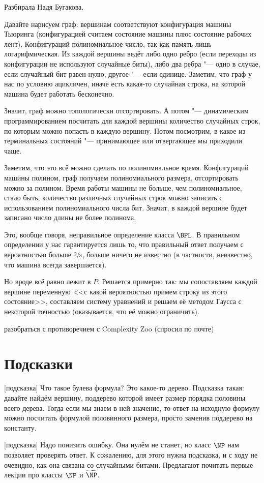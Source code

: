 	Разбирала Надя Бугакова.

	Давайте нарисуем граф: вершинам соответствуют конфигурация машины Тьюринга (конфигурацией
	считаем состояние машины плюс состояние рабочих лент).
	Конфигураций полиномиальное число, так как память лишь логарифмическая.
	Из каждой вершины ведёт либо одно ребро (если переходы из конфигурации не используют случайные биты),
	либо два ребра "--- одно в случае, если случайный бит равен нулю, другое "--- если единице.
	Заметим, что граф у нас по условию ацикличен, иначе есть какая-то случайная строка, на которой машина будет работать бесконечно.

	Значит, граф можно топологически отсортировать.
	А потом "--- динамическим программированием посчитать для каждой вершины количество случайных строк,
	по которым можно попасть в каждую вершину.
	Потом посмотрим, в какое из терминальных состояний "--- принимающее или отвергающее мы приходили чаще.

	Заметим, что это всё можно сделать по полиномиальное время.
	Конфигураций машины полином, граф получаем полиномиального размера, отсортировать можно за полином.
	Время работы машины не больше, чем полиномиальное, стало быть, количество
	различных случайных строк можно записать с использованием полиномиального числа бит.
	Значит, в каждой вершине будет записано число длины не более полинома.

	\begin{Rem}
		Это, вообще говоря, неправильное определение класса $\BPL$.
		В правильном определении у нас гарантируется лишь 
		то, что правильный ответ получаем с вероятностью больше $\sfrac 23$, больше ничего не известно
		(в частности, неизвестно, что машина всегда завершается).

		Но вроде всё равно лежит в $P$.
		Решается примерно так: мы сопоставляем каждой вершине переменную <<с какой вероятностью
		примем строку из этого состояние>>, составляем систему уравнений и решаем
		её методом Гаусса с некоторой точностью (оказывается, что её можно ограничить).

		\TODO разобраться с противоречием с Complexity Zoo (спросил по почте)
	\end{Rem}

\section{Подсказки}
[подсказка]
	Что такое булева формула?
	Это какое-то дерево.
	Подсказка такая: давайте найдём вершину, поддерево которой имеет размер порядка половины всего дерева.
	Тогда если мы знаем в ней значение, то ответ на исходную формулу можно посчитать формулой половинного размера,
	просто заменив поддерево на константу.

[подсказка]
	Надо понизить ошибку.
	Она нулём не станет, но класс $\NP$ нам позволяет проверять ответ.
	К сожалению, для этого нужна подсказка, и с ходу не очевидно, как она связана
	со случайными битами.
	Предлагают почитать первые лекции про классы $\NP$ и $\widetilde{\NP}$.
